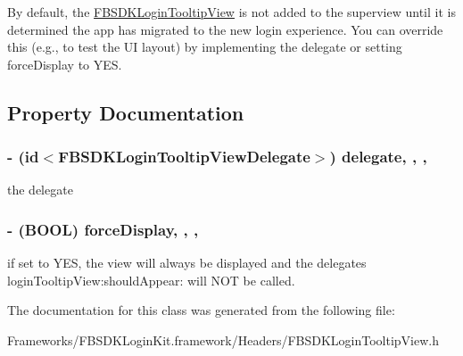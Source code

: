 By default, the {\ttfamily \hyperlink{interface_f_b_s_d_k_login_tooltip_view}{F\+B\+S\+D\+K\+Login\+Tooltip\+View}} is not added to the superview until it is determined the app has migrated to the new login experience. You can override this (e.\+g., to test the U\+I layout) by implementing the delegate or setting {\ttfamily force\+Display} to Y\+E\+S. 

\subsection{Property Documentation}
\hypertarget{interface_f_b_s_d_k_login_tooltip_view_a8f0879fab37905fb4b8f29515a055c00}{}
\subsubsection[{delegate}]{\setlength{\rightskip}{0pt plus 5cm}-\/ (id$<${\bf F\+B\+S\+D\+K\+Login\+Tooltip\+View\+Delegate}$>$) delegate\hspace{0.3cm}{\ttfamily [read]}, {\ttfamily [write]}, {\ttfamily [nonatomic]}, {\ttfamily [assign]}}\label{interface_f_b_s_d_k_login_tooltip_view_a8f0879fab37905fb4b8f29515a055c00}
the delegate \hypertarget{interface_f_b_s_d_k_login_tooltip_view_a5d7116f500f006d7d1d0d5c826b0b493}{}
\subsubsection[{force\+Display}]{\setlength{\rightskip}{0pt plus 5cm}-\/ (B\+O\+O\+L) force\+Display\hspace{0.3cm}{\ttfamily [read]}, {\ttfamily [write]}, {\ttfamily [nonatomic]}, {\ttfamily [assign]}}\label{interface_f_b_s_d_k_login_tooltip_view_a5d7116f500f006d7d1d0d5c826b0b493}
if set to Y\+E\+S, the view will always be displayed and the delegate\textquotesingle{}s {\ttfamily login\+Tooltip\+View\+:should\+Appear\+:} will N\+O\+T be called. 

The documentation for this class was generated from the following file\+:\begin{DoxyCompactItemize}
\item 
Frameworks/\+F\+B\+S\+D\+K\+Login\+Kit.\+framework/\+Headers/F\+B\+S\+D\+K\+Login\+Tooltip\+View.\+h\end{DoxyCompactItemize}
